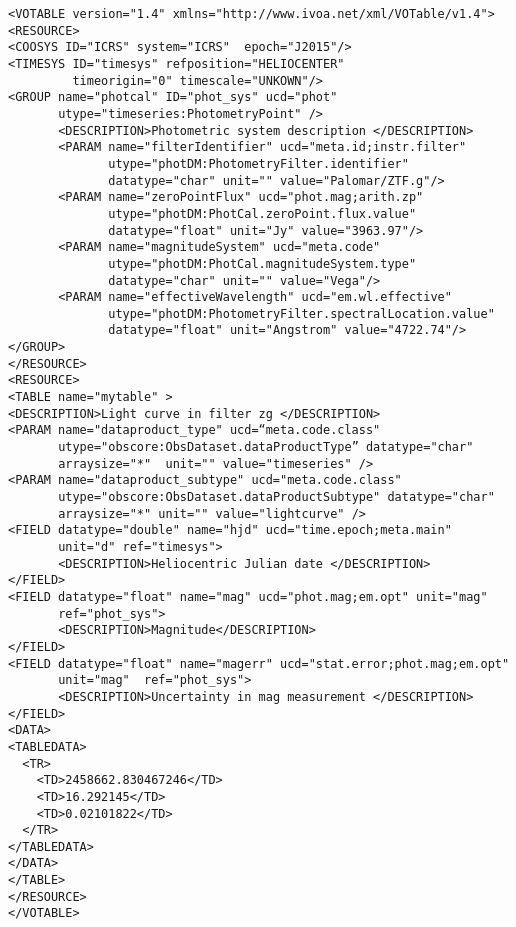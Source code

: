 \noindent
\begingroup\footnotesize
\begin{tcolorbox}
\begin{verbatim}
<VOTABLE version="1.4" xmlns="http://www.ivoa.net/xml/VOTable/v1.4">
<RESOURCE>
<COOSYS ID="ICRS" system="ICRS"  epoch="J2015"/>
<TIMESYS ID="timesys" refposition="HELIOCENTER" 
         timeorigin="0" timescale="UNKOWN"/>
<GROUP name="photcal" ID="phot_sys" ucd="phot" 
       utype="timeseries:PhotometryPoint" /> 
       <DESCRIPTION>Photometric system description </DESCRIPTION>
       <PARAM name="filterIdentifier" ucd="meta.id;instr.filter" 
              utype="photDM:PhotometryFilter.identifier" 
              datatype="char" unit="" value="Palomar/ZTF.g"/>
       <PARAM name="zeroPointFlux" ucd="phot.mag;arith.zp" 
              utype="photDM:PhotCal.zeroPoint.flux.value" 
              datatype="float" unit="Jy" value="3963.97"/>
       <PARAM name="magnitudeSystem" ucd="meta.code" 
              utype="photDM:PhotCal.magnitudeSystem.type" 
              datatype="char" unit="" value="Vega"/>
       <PARAM name="effectiveWavelength" ucd="em.wl.effective" 
              utype="photDM:PhotometryFilter.spectralLocation.value" 
              datatype="float" unit="Angstrom" value="4722.74"/>
</GROUP>
</RESOURCE>
<RESOURCE>
<TABLE name="mytable" >
<DESCRIPTION>Light curve in filter zg </DESCRIPTION>
<PARAM name="dataproduct_type" ucd=“meta.code.class" 
       utype="obscore:ObsDataset.dataProductType” datatype="char" 
       arraysize="*"  unit="" value="timeseries" />
<PARAM name="dataproduct_subtype" ucd="meta.code.class" 
       utype="obscore:ObsDataset.dataProductSubtype" datatype="char" 
       arraysize="*" unit="" value="lightcurve" />
<FIELD datatype="double" name="hjd" ucd="time.epoch;meta.main" 
       unit="d" ref="timesys">
       <DESCRIPTION>Heliocentric Julian date </DESCRIPTION>
</FIELD>
<FIELD datatype="float" name="mag" ucd="phot.mag;em.opt" unit="mag" 
       ref="phot_sys">
       <DESCRIPTION>Magnitude</DESCRIPTION>
</FIELD>
<FIELD datatype="float" name="magerr" ucd="stat.error;phot.mag;em.opt" 
       unit="mag"  ref="phot_sys">
       <DESCRIPTION>Uncertainty in mag measurement </DESCRIPTION>
</FIELD>
<DATA>  
<TABLEDATA>
  <TR>
    <TD>2458662.830467246</TD>
    <TD>16.292145</TD>
    <TD>0.02101822</TD>
  </TR>
</TABLEDATA>
</DATA>
</TABLE>
</RESOURCE>
</VOTABLE>
\end{verbatim}
\end{tcolorbox}
\endgroup
